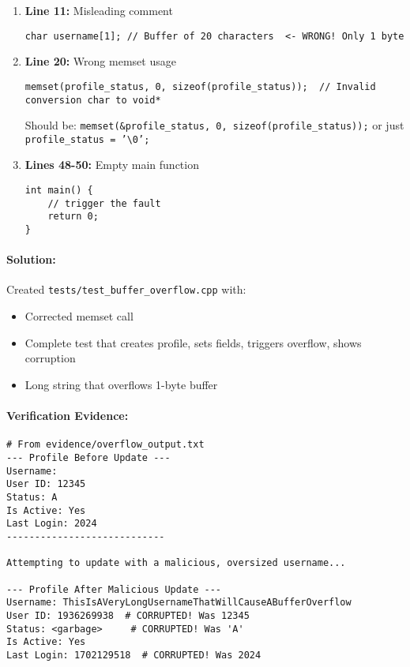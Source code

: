 \documentclass[11pt,a4paper]{article}
\begin{document}
\begin{enumerate}
    \item \textbf{Line 11:} Misleading comment
\begin{lstlisting}[style=cpp]
char username[1]; // Buffer of 20 characters  <- WRONG! Only 1 byte
\end{lstlisting}

    \item \textbf{Line 20:} Wrong memset usage
\begin{lstlisting}[style=cpp]
memset(profile_status, 0, sizeof(profile_status));  // Invalid conversion char to void*
\end{lstlisting}
Should be: \texttt{memset(\&profile\_status, 0, sizeof(profile\_status));} or just \texttt{profile\_status = '\textbackslash 0';}

    \item \textbf{Lines 48-50:} Empty main function
\begin{lstlisting}[style=cpp]
int main() {
    // trigger the fault
    return 0;
}
\end{lstlisting}
\end{enumerate}

\paragraph{Solution:}
Created \texttt{tests/test\_buffer\_overflow.cpp} with:
\begin{itemize}
    \item Corrected memset call
    \item Complete test that creates profile, sets fields, triggers overflow, shows corruption
    \item Long string that overflows 1-byte buffer
\end{itemize}

\paragraph{Verification Evidence:}
\begin{verbatim}
# From evidence/overflow_output.txt
--- Profile Before Update ---
Username:
User ID: 12345
Status: A
Is Active: Yes
Last Login: 2024
----------------------------

Attempting to update with a malicious, oversized username...

--- Profile After Malicious Update ---
Username: ThisIsAVeryLongUsernameThatWillCauseABufferOverflow
User ID: 1936269938  # CORRUPTED! Was 12345
Status: <garbage>     # CORRUPTED! Was 'A'
Is Active: Yes
Last Login: 1702129518  # CORRUPTED! Was 2024
\end{verbatim}
\end{document}
